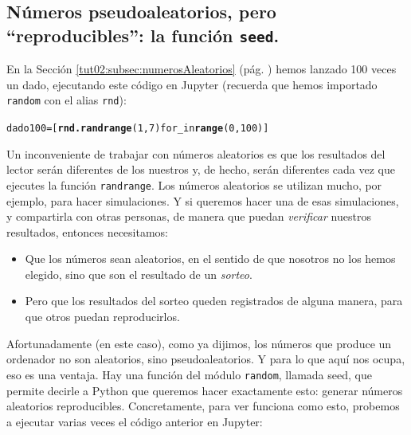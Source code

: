\documentclass[10pt,a4paper]{article}\usepackage[]{graphicx}\usepackage[]{color}
\makeatletter
\newcommand{\hlkwd}[1]{\textcolor[rgb]{0.737,0.353,0.396}{\textbf{#1}}}%
\newenvironment{kframe}{%
 \def\at@end@of@kframe{}%
 \ifinner\ifhmode%
  \def\at@end@of@kframe{\end{minipage}}%
  \begin{minipage}{\columnwidth}%
 \fi\fi%
 \def\FrameCommand##1{\hskip\@totalleftmargin \hskip-\fboxsep
 \colorbox{shadecolor}{##1}\hskip-\fboxsep
     \hskip-\linewidth \hskip-\@totalleftmargin \hskip\columnwidth}%
 \MakeFramed {\advance\hsize-\width
   \@totalleftmargin\z@ \linewidth\hsize
   \@setminipage}}%
 {\par\unskip\endMakeFramed%
 \at@end@of@kframe}
\newenvironment{knitrout}{}{} %
\makeatother
\begin{document}
\subsection{Números pseudoaleatorios, pero ``reproducibles'': la función {\tt seed}.}
\label{tut02:subsec:numerosAleatoriosReproduciblesSeed}

En la  Sección \ref{tut02:subsec:numerosAleatorios} (pág. \pageref{tut02:subsec:numerosAleatorios}) hemos lanzado 100 veces un dado,  ejecutando este código en Jupyter (recuerda que hemos importado {\tt random} con el alias {\tt rnd}):
\begin{knitrout}
\color{fgcolor}\begin{kframe}
\begin{alltt}
dado100 = [\hlkwd{rnd.randrange}(1, 7) for _ in \hlkwd{range}(0, 100)]
\end{alltt}
\end{kframe}
\end{knitrout}
Un inconveniente de trabajar con números aleatorios es que los resultados del lector serán diferentes de los nuestros y, de hecho, serán diferentes cada vez que ejecutes la función {\tt randrange}. Los números aleatorios se utilizan mucho, por ejemplo, para hacer simulaciones. Y si queremos hacer una de esas simulaciones, y compartirla con otras personas, de manera que puedan {\em verificar} nuestros resultados, entonces necesitamos:
\begin{itemize}
  \item Que los números sean aleatorios, en el sentido de que nosotros no los hemos elegido, sino que son el resultado de un {\em sorteo}.
  \item Pero que los resultados del sorteo queden registrados de alguna manera, para que otros puedan reproducirlos.
\end{itemize}
Afortunadamente (en este caso), como ya dijimos, los números que produce un ordenador no son aleatorios, sino pseudoaleatorios. Y para lo que aquí nos ocupa, eso es una ventaja. Hay una función del módulo {\tt random}, llamada {\sf seed}, que permite decirle a Python que queremos hacer exactamente esto: generar números aleatorios reproducibles. Concretamente, para ver funciona como esto, probemos a ejecutar varias veces el código anterior en Jupyter:
\end{document}
